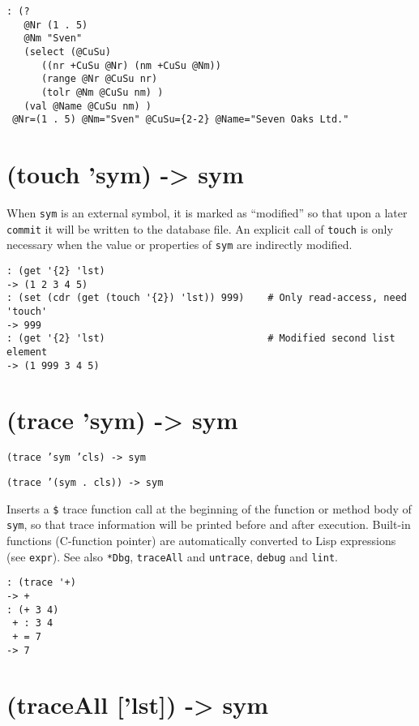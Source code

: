 {{{{{{{{\begin{verbatim}
: (?
   @Nr (1 . 5)
   @Nm "Sven"
   (select (@CuSu)
      ((nr +CuSu @Nr) (nm +CuSu @Nm))
      (range @Nr @CuSu nr)
      (tolr @Nm @CuSu nm) )
   (val @Name @CuSu nm) )
 @Nr=(1 . 5) @Nm="Sven" @CuSu={2-2} @Name="Seven Oaks Ltd."
\end{verbatim}

 
\section{(touch 'sym) -> sym}
\label{sec-8-1-20-22}


When \texttt{sym} is an external symbol, it is marked as ``modified'' so that
upon a later \texttt{commit} it will be written to the database file. An
explicit call of \texttt{touch} is only necessary when the value or properties
of \texttt{sym} are indirectly modified.


\begin{verbatim}
: (get '{2} 'lst)
-> (1 2 3 4 5)
: (set (cdr (get (touch '{2}) 'lst)) 999)    # Only read-access, need 'touch'
-> 999
: (get '{2} 'lst)                            # Modified second list element
-> (1 999 3 4 5)
\end{verbatim}

 
\section{(trace 'sym) -> sym}
\label{sec-8-1-20-23}


\texttt{(trace 'sym 'cls) -> sym}

\texttt{(trace '(sym . cls)) -> sym}

Inserts a \texttt{\$} trace function call at the beginning of the function or
method body of \texttt{sym}, so that trace information will be printed before
and after execution. Built-in functions (C-function pointer) are
automatically converted to Lisp expressions (see \texttt{expr}). See also
\texttt{*Dbg}, \texttt{traceAll} and \texttt{untrace}, \texttt{debug} and \texttt{lint}.


\begin{verbatim}
: (trace '+)
-> +
: (+ 3 4)
 + : 3 4
 + = 7
-> 7
\end{verbatim}

 
\section{(traceAll ['lst]) -> sym}
\label{sec-8-1-20-24}


}}}}}}}}
